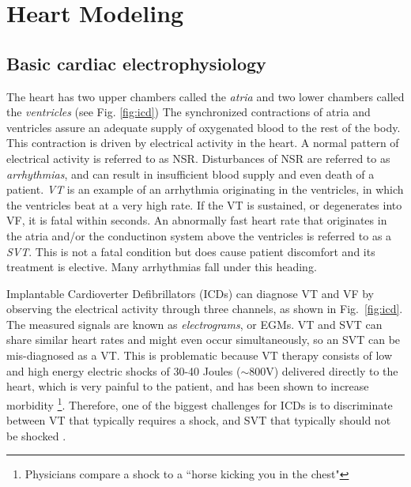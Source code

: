  \section{Heart Modeling}
 \label{sec:heart modeling}

\subsection{Basic cardiac electrophysiology}
\label{sec:cardiac ep}
The heart has two upper chambers called the \emph{atria} and two lower chambers called the \emph{ventricles} (see Fig. \ref{fig:icd})
The synchronized contractions of atria and ventricles assure an adequate supply of oxygenated blood to the rest of the body.
This contraction is driven by electrical activity in the heart.
A normal pattern of electrical activity is referred to as \ac{NSR}.
Disturbances of \ac{NSR} are referred to as \emph{arrhythmias}, and can result in insufficient blood supply and even death of a patient. 
\emph{\ac{VT}} is an example of an arrhythmia originating in the ventricles, in which the ventricles beat at a very high rate.
If the \ac{VT} is sustained, or degenerates into \ac{VF}, it is fatal within seconds.
An abnormally fast heart rate that originates in the atria and/or the conductinon system above the ventricles is referred to as a \emph{\ac{SVT}}.
This is not a fatal condition but does cause patient discomfort and its treatment is elective.
Many arrhythmias fall under this heading.

Implantable Cardioverter Defibrillators (ICDs) can diagnose \ac{VT} and \ac{VF} by observing the electrical activity through three channels, as shown in Fig.~\ref{fig:icd}.
The measured signals are known as \emph{electrograms}, or EGMs.
\ac{VT} and \ac{SVT} can share similar heart rates and might even occur simultaneously, so an \ac{SVT} can be mis-diagnosed as a \ac{VT}. 
This is problematic because \ac{VT} therapy consists of low and high energy electric shocks of 30-40 Joules ($\sim$800V) delivered directly to the heart, which is very painful to the patient, and has been shown to increase morbidity \cite{shock_mortality}\footnote{\small{Physicians compare a shock to a ``horse kicking you in the chest"}}.
Therefore, one of the biggest challenges for ICDs is to discriminate between \ac{VT} that typically requires a shock, and \ac{SVT} that typically should not be shocked \cite{Ellenbogen11_Pacingbook}.

